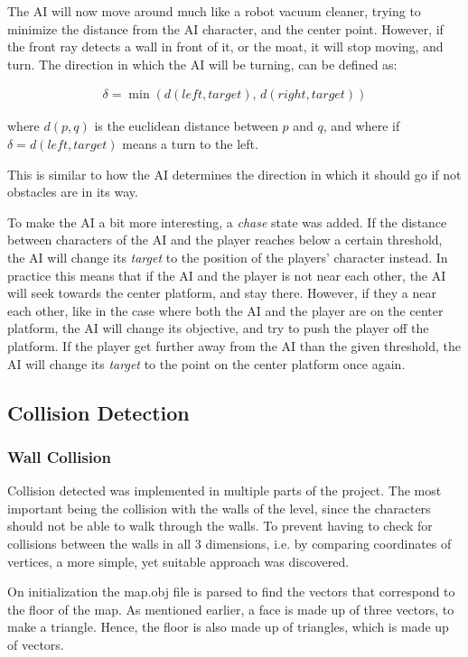 \documentclass[12pt,a4paper,titlepage]{article}
\begin{document}
The AI will now move around much like a robot vacuum cleaner, trying to
minimize the distance from the AI character, and the center point. However,
if the front ray detects a wall in front of it, or the moat, it will stop
moving, and turn. The direction in which the AI will be turning, can be
defined as:

\begin{align*}
\delta = \min(d(left, target),\, d(right, target))
\end{align*}

where $d(p,q)$ is the euclidean distance between $p$ and $q$, and where if
$\delta = d(left, target)$ means a turn to the left.

This is similar to how the AI determines the direction in which it should go
if not obstacles are in its way.

To make the AI a bit more interesting, a \emph{chase} state was added. If the
distance between characters of the AI and the player reaches below a certain
threshold, the
AI will change its \emph{target} to the position of the players' character instead. In
practice this means that if the AI and the player is not near each other, the
AI will seek towards the center platform, and stay there. However, if they a near each
other, like in the case where both the AI and the player are on the center
platform, the AI will change its objective, and try to push the player off
the platform. If the player get further away from the AI than the given
threshold, the AI will change its \emph{target} to the point on the center
platform once again.

\subsection*{Collision Detection}
\label{sec-2-4}
\subsubsection*{Wall Collision}
\label{sec-2-4-1}
Collision detected was implemented in multiple parts of the project. The
most important being the collision with the walls of the level, since the
characters should not be able to walk through the walls. To prevent having
to check for collisions between the walls in all 3 dimensions, i.e. by
comparing coordinates of vertices, a more simple, yet suitable approach was
discovered.

On initialization the map.obj file is parsed to find the vectors that
correspond to the floor of the map. As mentioned earlier, a face is made up
of three vectors, to make a triangle. Hence, the floor is also made up of
triangles, which is made up of vectors.
\end{document}
